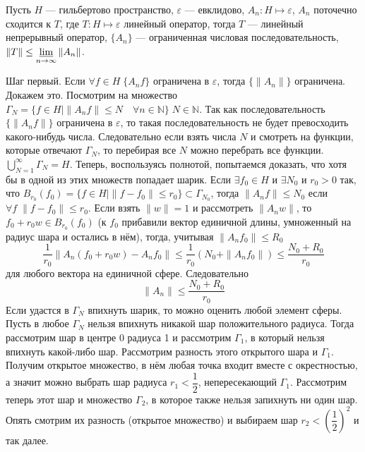 \documentclass[14pt]{extarticle}
\begin{document}
\begin{Theor}
    Пусть $H$ --- гильбертово пространство, $\varepsilon$ --- евклидово, $A_n : H \mapsto \varepsilon$, $A_n$ поточечно сходится к $T$,
    где $T : H \mapsto \varepsilon$
    линейный оператор, тогда $T$ --- линейный непрерывный оператор, $\{A_n\}$ --- ограниченная числовая последовательность, $\|T\| \le \varliminf\limits_
    {n\to \infty}\|A_n\|$.
\end{Theor}
\begin{Proof}
    Шаг первый. Если $\forall f \in H\; \{A_nf\}$ ограничена в $\varepsilon$, тогда $\{\|A_n\|\}$ ограничена.
    Докажем это.
    Посмотрим на множество $\Gamma_N = \{f \in H \mid \|A_n f\| \le N \quad \forall n \in \mathbb N\}\; N \in \mathbb N$.
    Так как последовательность $\{\|A_nf\|\}$ ограничена в $\varepsilon$, то такая последовательность не будет превосходить какого-нибудь числа.
    Следовательно если взять числа $N$ и смотреть на функции, которые отвечают $\Gamma_N$, то перебирая все $N$ можно перебрать все функции.
    $\bigcup\limits_{N = 1}^\infty \Gamma_N = H$.
    Теперь, воспользуясь полнотой, попытаемся доказать, что хотя бы в одной из этих множеств попадает шарик.
    Если $\exists f_0 \in H$ и $\exists N_0$ и $r_0 > 0$ так, что $B_{r_0}(f_0)=\{f \in H \mid \|f - f_0\| \le r_0\} \subset \Gamma_{N_0}$, тогда $\|A_n f\| \le N_0$
    если $\forall f\; \|f - f_0\| \le r_0$.
    Если взять $\|w\| = 1$ и рассмотреть $\|A_n w\|$, то $f_0 + r_0 w \in B_{r_0}(f_0)$ (к $f_0$ прибавили вектор единичной длины, умноженный на радиус шара
    и остались в нём), тогда, учитывая $\|A_n f_0\| \le R_0$
    $$
    \dfrac{1}{r_0}\|A_n(f_0 + r_0 w) - A_n f_0\| \le \dfrac{1}{r_0}(N_0 + \|A_n f_0\|)\le \dfrac{N_0 + R_0}{r_0}
    $$
    для любого вектора на единичной сфере.
    Следовательно 
    $$
    \|A_n\| \le \dfrac{N_0 + R_0}{r_0}
    $$
    Если удастся в $\Gamma_N$ впихнуть шарик, то можно оценить любой элемент сферы.
    Пусть в любое $\Gamma_N$ нельзя впихнуть никакой шар положительного радиуса.
    Тогда рассмотрим шар в центре 0 радиуса 1 и рассмотрим $\Gamma_1$, в который нельзя впихнуть какой-либо шар.
    Рассмотрим разность этого открытого шара и $\Gamma_1$.
    Получим открытое множество, в нём любая точка входит вместе с окрестностью, а значит можно выбрать шар радиуса $r_1 < \dfrac12$, непересекающий $\Gamma_1$.
    Рассмотрим теперь этот шар и множество $\Gamma_2$, в которое также нельзя запихнуть ни один шар.
    Опять смотрим их разность (открытое множество) и выбираем шар $r_2 < \left(\dfrac12\right)^2$ и так далее.

\end{Proof}
\end{document}
